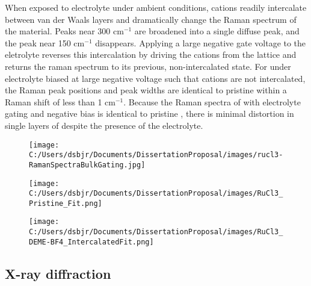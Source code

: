 \documentclass[11pt]{article}
\begin{document}
When exposed to electrolyte under ambient conditions, cations readily intercalate between van der Waals layers and dramatically change the Raman spectrum of the material. Peaks near 300 cm$^{-1}$ are broadened into a single diffuse peak, and the peak near 150 cm$^{-1}$ disappears. Applying a large negative gate voltage to the eletrolyte reverses this intercalation by driving the cations from the lattice and returns the raman spectrum to its previous, non-intercalated state. For \rucl under electrolyte biased at large negative voltage such that cations are not intercalated, the Raman peak positions and peak widths are identical to pristine \rucl within a Raman shift of less than 1 cm$^{-1}$. Because the Raman spectra of \rucl with electrolyte gating and negative bias is identical to pristine \ruclnospace , there is minimal distortion in single layers of \rucl despite the presence of the electrolyte.

\begin{figure}
\centering
\begin{minipage}{0.3\textwidth}
\centering 
  {\texttt{[image: C:/Users/dsbjr/Documents/DissertationProposal/images/rucl3-RamanSpectraBulkGating.jpg]}\label{fig:f4}}
  \captionsetup{width=0.9\textwidth}
\end{minipage}%
\begin{minipage}{0.3\textwidth}
\centering
  {\texttt{[image: C:/Users/dsbjr/Documents/DissertationProposal/images/RuCl3\_Pristine\_Fit.png]}\label{fig:f5}}
  \captionsetup{width=0.9\textwidth}
\end{minipage}%
\begin{minipage}{0.3\textwidth}
\centering
	{\texttt{[image: C:/Users/dsbjr/Documents/DissertationProposal/images/RuCl3\_DEME-BF4\_IntercalatedFit.png]}\label{fig:f6}}
	\captionsetup{width=0.9\textwidth}
\end{minipage}
\end{figure}


\subsection{X-ray diffraction}
\end{document}
